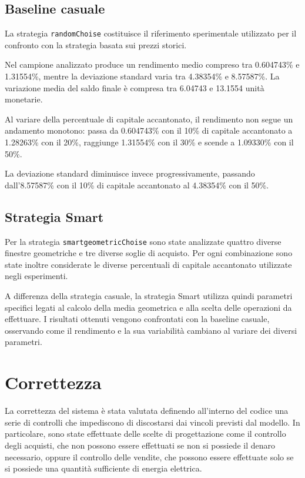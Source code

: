 \documentclass[a4paper,oneside,italian]{sapthesis}
\begin{document}
\subsection{Baseline casuale}

La strategia \texttt{randomChoise} costituisce il riferimento sperimentale
utilizzato per il confronto con la strategia basata sui prezzi storici.

Nel campione analizzato produce un rendimento medio compreso tra 0.604743\%
e 1.31554\%, mentre la deviazione standard varia tra 4.38354\% e 8.57587\%.
La variazione media del saldo finale è compresa tra 6.04743 e 13.1554 unità monetarie.

Al variare della percentuale di capitale accantonato, il rendimento non segue
un andamento monotono: passa da 0.604743\% con il 10\% di capitale accantonato
a 1.28263\% con il 20\%, raggiunge 1.31554\% con il 30\% e scende a 1.09330\%
con il 50\%.

La deviazione standard diminuisce invece progressivamente, passando dall'8.57587\%
con il 10\% di capitale accantonato al 4.38354\% con il 50\%.

\subsection{Strategia Smart}

Per la strategia \texttt{smartgeometricChoise} sono state analizzate quattro
diverse finestre geometriche e tre diverse soglie di acquisto. Per ogni
combinazione sono state inoltre considerate le diverse percentuali di
capitale accantonato utilizzate negli esperimenti.

A differenza della strategia casuale, la strategia Smart utilizza quindi
parametri specifici legati al calcolo della media geometrica e alla scelta
delle operazioni da effettuare. I risultati ottenuti vengono confrontati con
la baseline casuale, osservando come il rendimento e la sua variabilità
cambiano al variare dei diversi parametri.



\section{Correttezza}

La correttezza del sistema è stata valutata definendo all'interno del codice
una serie di controlli che impediscono di discostarsi dai vincoli previsti
dal modello. In particolare, sono state effettuate delle scelte di
progettazione come il controllo degli acquisti, che non possono essere
effettuati se non si possiede il denaro necessario, oppure il controllo delle
vendite, che possono essere effettuate solo se si possiede una quantità
sufficiente di energia elettrica.
\end{document}
